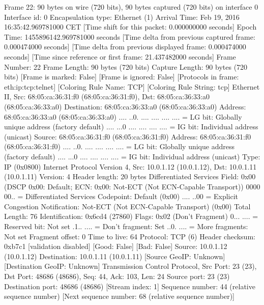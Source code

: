 Frame 22: 90 bytes on wire (720 bits), 90 bytes captured (720 bits) on interface 0
    Interface id: 0
    Encapsulation type: Ethernet (1)
    Arrival Time: Feb 19, 2016 16:35:42.969781000 CET
    [Time shift for this packet: 0.000000000 seconds]
    Epoch Time: 1455896142.969781000 seconds
    [Time delta from previous captured frame: 0.000474000 seconds]
    [Time delta from previous displayed frame: 0.000474000 seconds]
    [Time since reference or first frame: 21.437482000 seconds]
    Frame Number: 22
    Frame Length: 90 bytes (720 bits)
    Capture Length: 90 bytes (720 bits)
    [Frame is marked: False]
    [Frame is ignored: False]
    [Protocols in frame: eth:ip:tcp:telnet]
    [Coloring Rule Name: TCP]
    [Coloring Rule String: tcp]
Ethernet II, Src: 68:05:ca:36:31:f0 (68:05:ca:36:31:f0), Dst: 68:05:ca:36:33:a0 (68:05:ca:36:33:a0)
    Destination: 68:05:ca:36:33:a0 (68:05:ca:36:33:a0)
        Address: 68:05:ca:36:33:a0 (68:05:ca:36:33:a0)
        .... ..0. .... .... .... .... = LG bit: Globally unique address (factory default)
        .... ...0 .... .... .... .... = IG bit: Individual address (unicast)
    Source: 68:05:ca:36:31:f0 (68:05:ca:36:31:f0)
        Address: 68:05:ca:36:31:f0 (68:05:ca:36:31:f0)
        .... ..0. .... .... .... .... = LG bit: Globally unique address (factory default)
        .... ...0 .... .... .... .... = IG bit: Individual address (unicast)
    Type: IP (0x0800)
Internet Protocol Version 4, Src: 10.0.1.12 (10.0.1.12), Dst: 10.0.1.11 (10.0.1.11)
    Version: 4
    Header length: 20 bytes
    Differentiated Services Field: 0x00 (DSCP 0x00: Default; ECN: 0x00: Not-ECT (Not ECN-Capable Transport))
        0000 00.. = Differentiated Services Codepoint: Default (0x00)
        .... ..00 = Explicit Congestion Notification: Not-ECT (Not ECN-Capable Transport) (0x00)
    Total Length: 76
    Identification: 0x6cd4 (27860)
    Flags: 0x02 (Don't Fragment)
        0... .... = Reserved bit: Not set
        .1.. .... = Don't fragment: Set
        ..0. .... = More fragments: Not set
    Fragment offset: 0
    Time to live: 64
    Protocol: TCP (6)
    Header checksum: 0xb7c1 [validation disabled]
        [Good: False]
        [Bad: False]
    Source: 10.0.1.12 (10.0.1.12)
    Destination: 10.0.1.11 (10.0.1.11)
    [Source GeoIP: Unknown]
    [Destination GeoIP: Unknown]
Transmission Control Protocol, Src Port: 23 (23), Dst Port: 48686 (48686), Seq: 44, Ack: 103, Len: 24
    Source port: 23 (23)
    Destination port: 48686 (48686)
    [Stream index: 1]
    Sequence number: 44    (relative sequence number)
    [Next sequence number: 68    (relative sequence number)]
